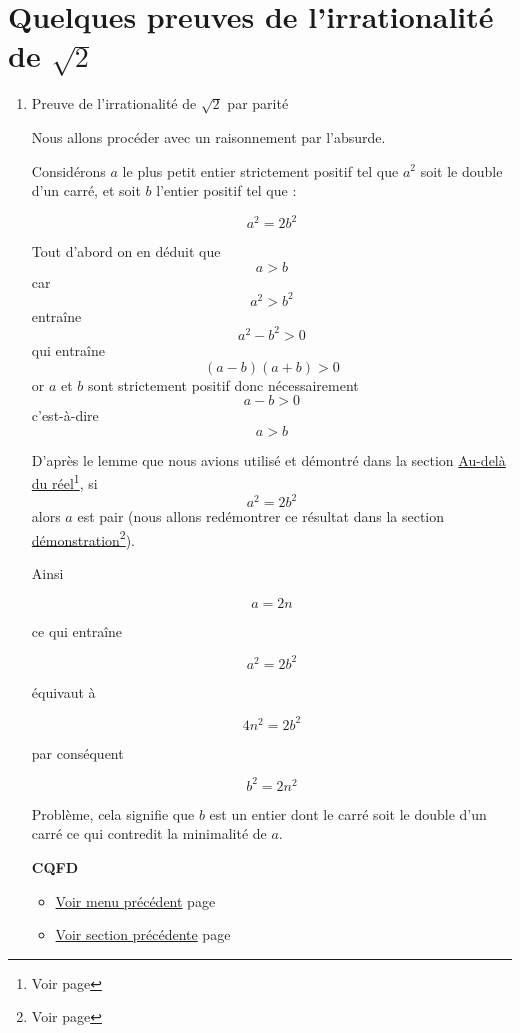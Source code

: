 \documentclass[a4paper,11pt]{book}
\begin{document}
\clearpage

\section{Quelques preuves de l'irrationalité de \(\sqrt{2}\)}
\label{sec:org2541f0e}
\label{orgea5a5bb}
\label{page:sqrt2proofs}

\clearpage

\begin{enumerate}
\item Preuve de l'irrationalité de \(\sqrt{2}\) par parité
\label{sec:org0f59b9c}
\label{orga92af80}
\label{page:sqrt2proof1parity-proof}


Nous allons procéder avec un raisonnement par l'absurde.

Considérons \(a\) le plus petit entier strictement positif tel que
\(a^2\) soit le double d'un carré, et soit \(b\) l'entier positif tel
que :

\[a^2 = 2b^2\]

Tout d'abord on en déduit que \[a > b\] car \[a^2 > b^2\] entraîne
\[a^2 - b^2 > 0\] qui entraîne \[(a - b)(a + b) > 0\] or \(a\)
et \(b\) sont strictement positif donc nécessairement \[a - b > 0\]
c'est-à-dire \[a > b\]

D'après le lemme que nous avions utilisé et démontré dans la section
\hyperref[orgff5d9b3]{Au-delà du réel}\footnote{Voir page \pageref{page:sec2.1.5real}}, si \[a^2 = 2b^2\] alors \(a\) est pair
(nous allons redémontrer ce résultat dans la section \hyperref[org08a4120]{démonstration}\footnote{Voir page \pageref{page:sec4proofs}}).


Ainsi

\[a = 2n\]

ce qui entraîne

\[a^2 = 2b^2\]

équivaut à

\[4n^2 = 2b^2\]

par conséquent

\[b^2 = 2n^2\]


Problème, cela signifie que \(b\) est un entier dont le carré soit le
double d'un carré ce qui contredit la minimalité de \(a\).

\textbf{CQFD}

\begin{itemize}
\item \hyperref[orgc112f4f]{Voir menu précédent}
page~\pageref{page:content6-menu}
\item \hyperref[orgb8d930f]{Voir section précédente}
page~\pageref{page:sec2.6.4irr}
\end{itemize}



\end{enumerate}
\end{document}
